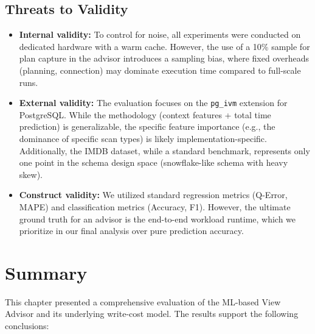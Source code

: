 \subsection{Threats to Validity}
\label{sec:threats}

\begin{itemize}
    \item \textbf{Internal validity:} To control for noise, all experiments were conducted on dedicated hardware with a warm cache. However, the use of a 10\% sample for plan capture in the advisor introduces a sampling bias, where fixed overheads (planning, connection) may dominate execution time compared to full-scale runs.
    
    \item \textbf{External validity:} The evaluation focuses on the \texttt{pg\_ivm} extension for PostgreSQL. While the methodology (context features + total time prediction) is generalizable, the specific feature importance (e.g., the dominance of specific scan types) is likely implementation-specific. Additionally, the IMDB dataset, while a standard benchmark, represents only one point in the schema design space (snowflake-like schema with heavy skew).
    
    \item \textbf{Construct validity:} We utilized standard regression metrics (Q-Error, MAPE) and classification metrics (Accuracy, F1). However, the ultimate ground truth for an advisor is the end-to-end workload runtime, which we prioritize in our final analysis over pure prediction accuracy.
\end{itemize}

\section{Summary}
\label{sec:evaluation_summary}

This chapter presented a comprehensive evaluation of the \ac{ML}-based View Advisor and its underlying write-cost model. The results support the following conclusions:

